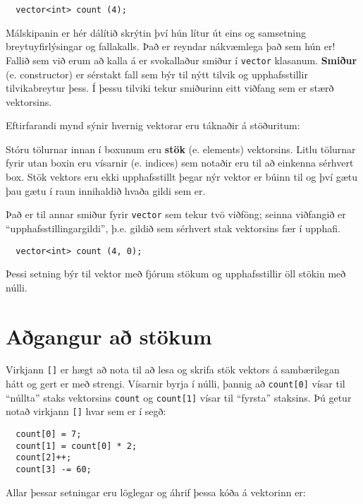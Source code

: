 \begin{verbatim}
  vector<int> count (4);
\end{verbatim}
%
Málskipanin er hér dálítið skrýtin því hún lítur út eins og samsetning breytuyfirlýsingar og fallakalls.
Það er reyndar nákvæmlega það sem hún er!
Fallið sem við erum að kalla á er svokallaður smiður í {\tt vector} klasanum.
{\bf Smiður} (e. constructor) er sérstakt fall sem býr til nýtt tilvik og upphafsstillir tilvikabreytur þess.
Í þessu tilviki tekur smiðurinn eitt viðfang sem er stærð vektorsins.


Eftirfarandi mynd sýnir hvernig vektorar eru táknaðir á stöðuritum:

\vspace{0.1in}
\centerline{}
\vspace{0.1in}

Stóru tölurnar innan í boxunum eru {\bf stök} (e. elements) vektorsins. 
Litlu tölurnar fyrir utan boxin eru vísarnir (e. indices) sem notaðir eru til að einkenna sérhvert box.
Stök vektors eru ekki upphafsstillt þegar nýr vektor er búinn til og því gætu þau gætu í raun innihaldið hvaða gildi sem er.

Það er til annar smiður fyrir {\tt vector} sem tekur tvö viðföng; seinna viðfangið er ``upphafsstillingargildi'', þ.e. gildið sem sérhvert stak vektorsins fær í upphafi.

\begin{verbatim}
  vector<int> count (4, 0);
\end{verbatim}
%
Þessi setning býr til vektor með fjórum stökum og upphafsstillir öll stökin með núlli.

\section{Aðgangur að stökum}

Virkjann {\tt []} er hægt að nota til að lesa og skrifa stök vektors á sambærilegan hátt og gert er með strengi.
Vísarnir byrja í núlli, þannig að {\tt count[0]} vísar til ``núllta'' staks vektorsins {\tt count} og
{\tt count[1]} vísar til ``fyrsta'' staksins.
Þú getur notað virkjann {\tt []} hvar sem er í segð:

\begin{verbatim}
  count[0] = 7;
  count[1] = count[0] * 2;
  count[2]++;
  count[3] -= 60;
\end{verbatim}
%
Allar þessar setningar eru löglegar og áhrif þessa kóða á vektorinn er: 

